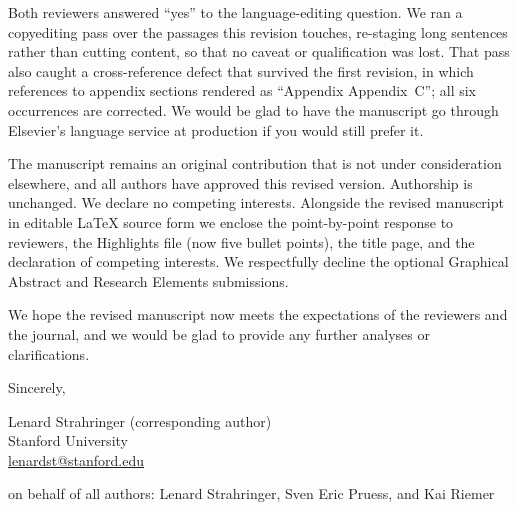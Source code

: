 \documentclass[12pt]{article}
\begin{document}
\vspace{0.5em}

\noindent Both reviewers answered ``yes'' to the language-editing question. We ran a copyediting pass over the passages this revision touches, re-staging long sentences rather than cutting content, so that no caveat or qualification was lost. That pass also caught a cross-reference defect that survived the first revision, in which references to appendix sections rendered as ``Appendix Appendix~C''; all six occurrences are corrected. We would be glad to have the manuscript go through Elsevier's language service at production if you would still prefer it.

\vspace{0.5em}

\noindent The manuscript remains an original contribution that is not under consideration elsewhere, and all authors have approved this revised version. Authorship is unchanged. We declare no competing interests. Alongside the revised manuscript in editable \LaTeX{} source form we enclose the point-by-point response to reviewers, the Highlights file (now five bullet points), the title page, and the declaration of competing interests. We respectfully decline the optional Graphical Abstract and Research Elements submissions.

\vspace{0.5em}

\noindent We hope the revised manuscript now meets the expectations of the reviewers and the journal, and we would be glad to provide any further analyses or clarifications.

\vspace{1em}

\noindent Sincerely,

\vspace{0.5em}

\noindent Lenard Strahringer (corresponding author)\\
Stanford University\\
\href{mailto:lenardst@stanford.edu}{lenardst@stanford.edu}

\vspace{0.5em}

\noindent on behalf of all authors: Lenard Strahringer, Sven Eric Pruess, and Kai Riemer
\end{document}
